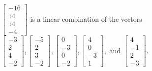 \begin{exercise}
\begin{exerciseStatement}
  \end{exerciseStatement}
  \begin{exerciseAnswer}
   \(\left[\begin{array}{c}
-16 \\
14 \\
14 \\
-4
\end{array}\right]\) 
  	 is  
	a linear combination of the vectors \(\left[\begin{array}{c}
-3 \\
2 \\
4 \\
-2
\end{array}\right] , \left[\begin{array}{c}
-5 \\
2 \\
3 \\
-2
\end{array}\right] , \left[\begin{array}{c}
0 \\
-3 \\
0 \\
-2
\end{array}\right] , \left[\begin{array}{c}
4 \\
0 \\
-3 \\
1
\end{array}\right] , \text{ and } \left[\begin{array}{c}
4 \\
-1 \\
2 \\
-3
\end{array}\right]\).

	
  


  \end{exerciseAnswer}
\end{exercise}